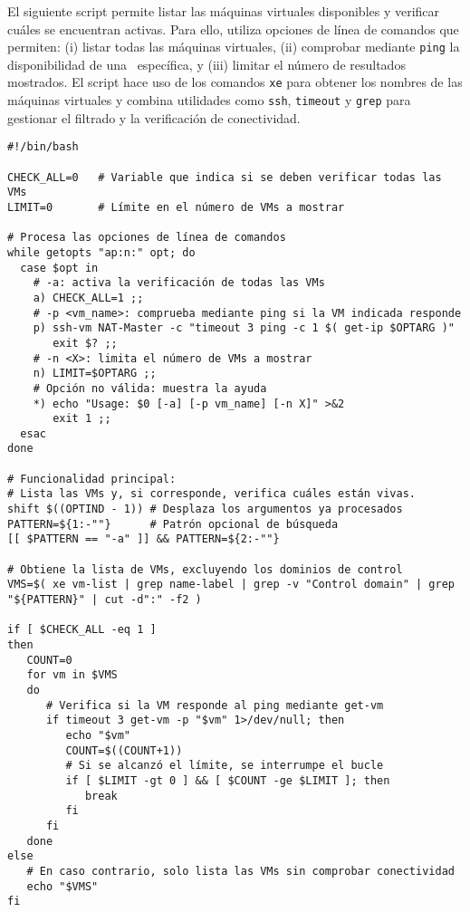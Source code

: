 El siguiente script permite listar las máquinas virtuales disponibles y verificar cuáles se encuentran activas. Para ello, utiliza opciones de línea de comandos que permiten: (i) listar todas las máquinas virtuales, (ii) comprobar mediante \texttt{ping} la disponibilidad de una \VM\ específica, y (iii) limitar el número de resultados mostrados. El script hace uso de los comandos \texttt{xe} para obtener los nombres de las máquinas virtuales y combina utilidades como \texttt{ssh}, \texttt{timeout} y \texttt{grep} para gestionar el filtrado y la verificación de conectividad. 

\begin{verbatim}
#!/bin/bash

CHECK_ALL=0   # Variable que indica si se deben verificar todas las VMs
LIMIT=0       # Límite en el número de VMs a mostrar

# Procesa las opciones de línea de comandos
while getopts "ap:n:" opt; do
  case $opt in
    # -a: activa la verificación de todas las VMs
    a) CHECK_ALL=1 ;;
    # -p <vm_name>: comprueba mediante ping si la VM indicada responde
    p) ssh-vm NAT-Master -c "timeout 3 ping -c 1 $( get-ip $OPTARG )"
       exit $? ;;
    # -n <X>: limita el número de VMs a mostrar
    n) LIMIT=$OPTARG ;;
    # Opción no válida: muestra la ayuda
    *) echo "Usage: $0 [-a] [-p vm_name] [-n X]" >&2
       exit 1 ;;
  esac
done

# Funcionalidad principal:
# Lista las VMs y, si corresponde, verifica cuáles están vivas.
shift $((OPTIND - 1)) # Desplaza los argumentos ya procesados
PATTERN=${1:-""}      # Patrón opcional de búsqueda
[[ $PATTERN == "-a" ]] && PATTERN=${2:-""}

# Obtiene la lista de VMs, excluyendo los dominios de control
VMS=$( xe vm-list | grep name-label | grep -v "Control domain" | grep "${PATTERN}" | cut -d":" -f2 )

if [ $CHECK_ALL -eq 1 ]
then
   COUNT=0
   for vm in $VMS
   do
      # Verifica si la VM responde al ping mediante get-vm
      if timeout 3 get-vm -p "$vm" 1>/dev/null; then
         echo "$vm"
         COUNT=$((COUNT+1))
         # Si se alcanzó el límite, se interrumpe el bucle
         if [ $LIMIT -gt 0 ] && [ $COUNT -ge $LIMIT ]; then
            break
         fi
      fi
   done
else
   # En caso contrario, solo lista las VMs sin comprobar conectividad
   echo "$VMS"
fi
\end{verbatim}